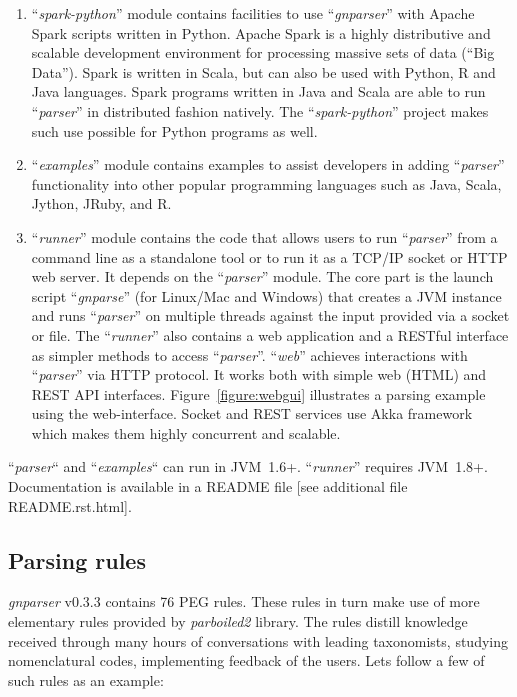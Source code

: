 \documentclass{bmcart}
\begin{document}
\begin{enumerate}
\begin{itemize}
\end{itemize}

  \item ``\textit{spark-python}'' module contains facilities to use ``\textit{gnparser}'' with Apache Spark scripts written in Python. Apache Spark is a highly distributive and scalable development environment for processing massive sets of data (``Big Data''). Spark is written in Scala, but can also be used with Python, R and Java languages. Spark programs written in Java and Scala are able to run ``\textit{parser}'' in distributed fashion natively. The ``\textit{spark-python}'' project makes such use possible for Python programs as well.

  \item ``\textit{examples}'' module contains examples to assist developers in adding ``\textit{parser}'' functionality into other popular programming languages such as Java, Scala, Jython, JRuby, and R.

  \item ``\textit{runner}'' module contains the code that allows users to run ``\textit{parser}'' from a command line as a standalone tool or to run it as a TCP/IP socket or HTTP web server. It depends on the ``\textit{parser}'' module. The core part is the launch script ``\textit{gnparse}'' (for Linux/Mac and Windows) that creates a JVM instance and runs ``\textit{parser}'' on multiple threads against the input provided via a socket or file. The ``\textit{runner}'' also contains a web application and a RESTful interface as simpler methods to access ``\textit{parser}''. ``\textit{web}'' achieves interactions with ``\textit{parser}'' via HTTP protocol. It works both with simple web (HTML) and REST API interfaces. Figure~\ref{figure:webgui} illustrates a parsing example using the web-interface. Socket and REST services use Akka framework which makes them highly concurrent and scalable.

\end{enumerate}

``\textit{parser}`` and ``\textit{examples}`` can run in JVM~1.6+.  ``\textit{runner}'' requires JVM~1.8+. Documentation is available in a README file [see additional file README.rst.html].

\subsection*{Parsing rules}

\textit{gnparser} v0.3.3 contains 76 PEG rules. These rules in turn make use of more elementary rules provided by \textit{parboiled2} library. The rules distill knowledge received through many hours of conversations with leading taxonomists, studying nomenclatural codes, implementing feedback of the users.
Lets follow a few of such rules as an example:
\end{document}
